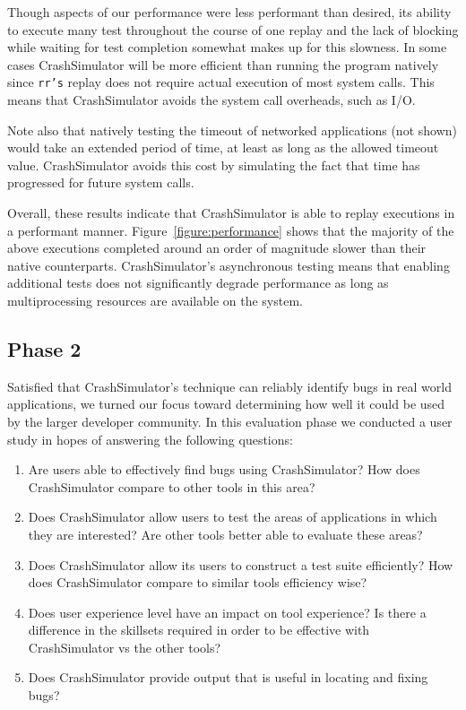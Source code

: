 Though aspects of our performance were less performant than desired, its
ability to execute many test throughout the course of one replay and the
lack of blocking while waiting for test completion somewhat makes up for
this slowness. In some cases CrashSimulator will be more efficient than
running the program natively since {\tt rr's} replay does not require
actual execution of most system calls.  This means that CrashSimulator
avoids the system call overheads, such as I/O.

Note also that natively testing the timeout of networked applications (not
shown) would take an extended period of time, at least as long as the
allowed timeout value.  CrashSimulator avoids this cost by simulating the
fact that time has progressed for future system calls.

Overall, these results indicate that CrashSimulator is able to replay
executions in a performant manner.  Figure~\ref{figure:performance} shows
that the majority of the above executions completed around an order of
magnitude slower than their native counterparts.  CrashSimulator's
asynchronous testing means that enabling additional tests does not
significantly degrade performance as long as multiprocessing resources are
available on the system.


\subsection{Phase 2}

Satisfied that CrashSimulator's technique can reliably identify bugs in
real world applications, we turned our focus toward determining how well it
could be used by the larger developer community.  In this evaluation phase
we conducted a user study in hopes of answering the following questions:

\begin{enumerate}

\item Are users able to effectively find bugs using CrashSimulator?  How
does CrashSimulator compare to other tools in this area?

\item Does CrashSimulator allow users to test the areas of
applications in which they are interested?  Are other tools better able to
evaluate these areas?

\item Does CrashSimulator allow its users to construct a test suite
efficiently?  How does CrashSimulator compare to similar tools
efficiency wise?

\item Does user experience level have an impact on tool experience?  Is
there a difference in the skillsets required in order to be effective
with CrashSimulator vs the other tools?

\item Does CrashSimulator provide output that is useful in locating and
fixing bugs?

\end{enumerate}

